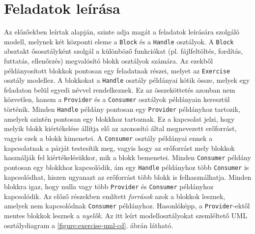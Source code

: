 \section{Feladatok leírása}
Az előzőekben leírtak alapján, szinte adja magát a feladatok leírására szolgáló modell, melynek két központi eleme a \texttt{Block} és a \texttt{Handle} osztályok.
A \texttt{Block} absztakt ősosztályként szolgál a különböző funkciókat (pl. fájlfeltöltés, fordítás, futtatás, ellenőrzés) megvalósító blokk osztályok számára.
Az ezekből példányosított blokkok pontosan egy feladatnak részei, melyet az \texttt{Exercise} osztály modellez.
A blokkokat a \texttt{Handle} osztály példányai kötik össze, melyek egy feladaton belül egyedi névvel rendelkeznek.
Ez az összeköttetés azonban nem közvetlen, hanem a \texttt{Provider} és a \texttt{Consumer} osztályok példányain keresztül történik.
Minden \texttt{Handle} példány pontosan egy \texttt{Provider} példányhoz tartozik, amelyek szintén pontosan egy blokkhoz tartoznak.
Ez a kapcsolat jelzi, hogy melyik blokk kiértékelése állítja elő az azonosító által megnevezett erőforrást, vagyis ezek a blokk kimenetei.
A \texttt{Consumer} osztály példányai ennek a kapcsolatnak a párját testesítik meg, vagyis hogy az erőforrást mely blokkok használják fel kiértékelésükkor, mik a blokk bemenetei.
Minden \texttt{Consumer} példány pontosan egy blokkhoz kapcsolódik, ám egy \texttt{Handle} példányhoz több \texttt{Consumer} is kapcsolódhat, hiszen ugyanazt az erőforrást több blokk is felhasználhatja.
Minden blokkra igaz, hogy nulla vagy több \texttt{Provider} és \texttt{Consumer} példányhoz kapcsolódik.
Az előző részekben említett \textit{források} azok a blokkok lesznek, amelyek nem kapcsolódnak \texttt{Consumer} példányhoz.
Hasonlóképp, a \texttt{Provider}-ektől mentes blokkok lesznek a \textit{nyelők}.
Az itt leírt modellosztályokat szemléltető UML osztálydiagram a \ref{figure:exercise-uml-cd}. ábrán látható.

